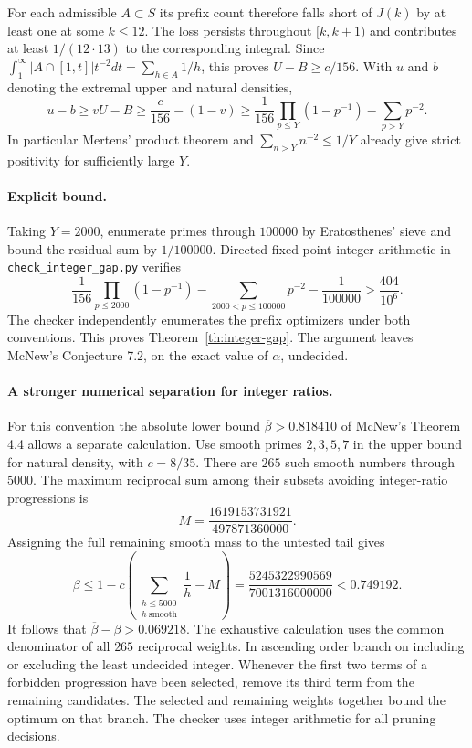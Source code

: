 For each admissible $A\subset S$ its prefix count therefore falls short of $J(k)$ by at least one at some $k\le12$. The loss persists throughout $[k,k+1)$ and contributes at least $1/(12\cdot13)$ to the corresponding integral. Since $\int_1^\infty |A\cap[1,t]|t^{-2}dt=\sum_{h\in A}1/h$, this proves $U-B\ge c/156$. With $u$ and $b$ denoting the extremal upper and natural densities,
\[
 u-b\ge vU-B\ge \frac{c}{156}-(1-v)
       \ge \frac{1}{156}\prod_{p\le Y}(1-p^{-1}) - \sum_{p>Y}p^{-2}.
\]
In particular Mertens' product theorem and $\sum_{n>Y}n^{-2}\le1/Y$ already give strict positivity for sufficiently large $Y$.

\paragraph{Explicit bound.}
Taking $Y=2000$, enumerate primes through $100000$ by Eratosthenes' sieve and bound the residual sum by $1/100000$. Directed fixed-point integer arithmetic in \texttt{check\_integer\_gap.py} verifies
\[
 \frac{1}{156}\prod_{p\le2000}(1-p^{-1})-
 \sum_{2000<p\le100000}p^{-2}-\frac{1}{100000}
 >\frac{404}{10^6}.
\]
The checker independently enumerates the prefix optimizers under both conventions. This proves Theorem~\ref{th:integer-gap}. The argument leaves McNew's Conjecture 7.2, on the exact value of $\alpha$, undecided.

\paragraph{A stronger numerical separation for integer ratios.}
For this convention the absolute lower bound $\overline\beta>0.818410$ of McNew's Theorem 4.4 allows a separate calculation. Use smooth primes $2,3,5,7$ in the upper bound for natural density, with $c=8/35$. There are $265$ such smooth numbers through $5000$. The maximum reciprocal sum among their subsets avoiding integer-ratio progressions is
\[
 M=\frac{1619153731921}{497871360000}.
\]
Assigning the full remaining smooth mass to the untested tail gives
\[
 \beta\le 1-c\left(\sum_{\substack{h\le5000\\ h\ \mathrm{smooth}}}\frac1h-M\right)
 =\frac{5245322990569}{7001316000000}<0.749192.
\]
It follows that $\overline\beta-\beta>0.069218$. The exhaustive calculation uses the common denominator of all $265$ reciprocal weights. In ascending order branch on including or excluding the least undecided integer. Whenever the first two terms of a forbidden progression have been selected, remove its third term from the remaining candidates. The selected and remaining weights together bound the optimum on that branch. The checker uses integer arithmetic for all pruning decisions.
